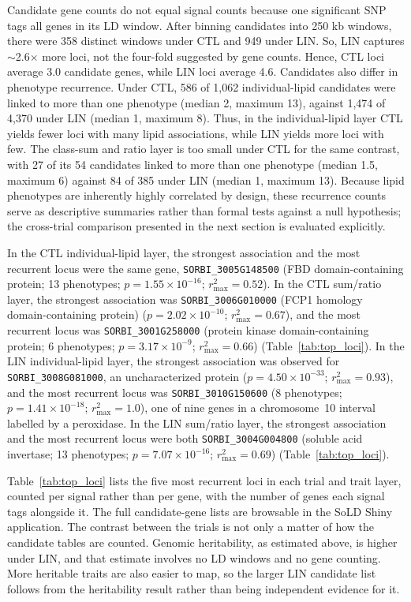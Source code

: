 \documentclass[9pt,twocolumn,twoside]{rilabRxiv}
\begin{document}
Candidate gene counts do not equal signal counts because one significant SNP tags all genes in its LD window. After binning candidates into 250 kb windows, there were 358 distinct windows under CTL and 949 under LIN. So, LIN captures $\sim$2.6$\times$ more loci, not the four-fold suggested by gene counts. Hence, CTL loci average 3.0 candidate genes, while LIN loci average 4.6. Candidates also differ in phenotype recurrence. Under CTL, 586 of 1,062 individual-lipid candidates were linked to more than one phenotype (median 2, maximum 13), against 1,474 of 4,370 under LIN (median 1, maximum 8). Thus, in the individual-lipid layer CTL yields fewer loci with many lipid associations, while LIN yields more loci with few. The class-sum and ratio layer is too small under CTL for the same contrast, with 27 of its 54 candidates linked to more than one phenotype (median 1.5, maximum 6) against 84 of 385 under LIN (median 1, maximum 13). Because lipid phenotypes are inherently highly correlated by design, these recurrence counts serve as descriptive summaries rather than formal tests against a null hypothesis; the cross-trial comparison presented in the next section is evaluated explicitly.

In the CTL individual-lipid layer, the strongest association and the most recurrent locus were the same gene, \texttt{SORBI\_3005G148500} (FBD domain-containing protein; 13 phenotypes; $p = 1.55\times10^{-16}$; $r^2_{\max}=0.52$). In the CTL sum/ratio layer, the strongest association was \texttt{SORBI\_3006G010000} (FCP1 homology domain-containing protein) ($p = 2.02\times10^{-10}$; $r^2_{\max}=0.67$), and the most recurrent locus was \texttt{SORBI\_3001G258000} (protein kinase domain-containing protein; 6 phenotypes; $p = 3.17\times10^{-9}$; $r^2_{\max}=0.66$) (Table~\ref{tab:top_loci}). In the LIN individual-lipid layer, the strongest association was observed for \texttt{SORBI\_3008G081000}, an uncharacterized protein ($p = 4.50\times10^{-33}$; $r^2_{\max}=0.93$), and the most recurrent locus was \texttt{SORBI\_3010G150600} (8 phenotypes; $p = 1.41\times10^{-18}$; $r^2_{\max}=1.0$), one of nine genes in a chromosome~10 interval labelled by a peroxidase. In the LIN sum/ratio layer, the strongest association and the most recurrent locus were both \texttt{SORBI\_3004G004800} (soluble acid invertase; 13 phenotypes; $p = 7.07\times10^{-16}$; $r^2_{\max}=0.69$) (Table~\ref{tab:top_loci}).

Table~\ref{tab:top_loci} lists the five most recurrent loci in each trial and trait layer, counted per signal rather than per gene, with the number of genes each signal tags alongside it. The full candidate-gene lists are browsable in the SoLD Shiny application. The contrast between the trials is not only a matter of how the candidate tables are counted. Genomic heritability, as estimated above, is higher under LIN, and that estimate involves no LD windows and no gene counting. More heritable traits are also easier to map, so the larger LIN candidate list follows from the heritability result rather than being independent evidence for it.
\end{document}

